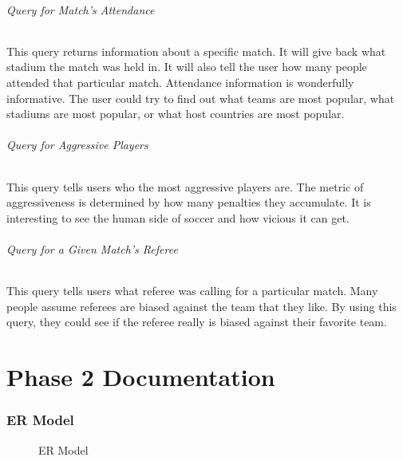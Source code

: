\documentclass{article}
\begin{document}
\paragraph{Query for Match's Attendance}
This query returns information about a specific match. It will give back what stadium the match was held in. It will also tell the user how many people attended that particular match. Attendance information is wonderfully informative. The user could try to find out what teams are most popular, what stadiums are most popular, or what host countries are most popular.  
\paragraph{Query for Aggressive Players}
This query tells users who the most aggressive players are. The metric of aggressiveness is determined by how many penalties they accumulate. It is interesting to see the human side of soccer and how vicious it can get.
\paragraph{Query for a Given Match's Referee}
This query tells users what referee was calling for a particular match. Many people assume referees are biased against the team that they like. By using this query, they could see if the referee really is biased against their favorite team.

\part{Phase 2 Documentation}

\section{ER Model}
\begin{figure}[ph]
	\caption {ER Model}
	\label{ermodel}
\end{figure}
\end{document}
